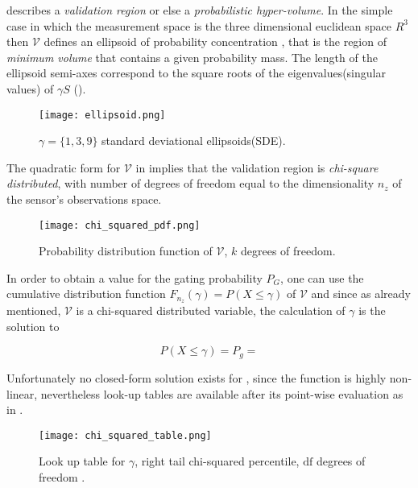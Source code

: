  describes a \emph{validation region} or else a \emph{probabilistic hyper-volume}. In the simple case in which the measurement space is the three dimensional euclidean space $R^3$ then $\mathcal{V}$ defines an ellipsoid of probability concentration , that is the region of \emph{minimum volume }that contains a given probability mass. The length of the ellipsoid semi-axes correspond to the square roots of the eigenvalues(singular values) of $\gamma S$ ().

\begin{figure}[H]
	\centering
	\texttt{[image: ellipsoid.png]}
	\caption{$\gamma = \{1,3,9\}$ standard deviational ellipsoids(SDE)\cite{Wang2015}.}
	\label{fig:ellipsoid}
\end{figure}


The quadratic form for $\mathcal{V}$ in  implies that the validation region is \emph{chi-square distributed}, with number of degrees of freedom equal to the dimensionality $n_z$ of the sensor's observations space.


\begin{figure}[H]
	\centering
	\texttt{[image: chi\_squared\_pdf.png]}
	\caption{Probability distribution function of $\mathcal{V}$, $k$ degrees of freedom.}
	\label{fig:chisquared}
\end{figure}


In order to obtain a value for the gating probability $P_G$, one can use the cumulative distribution function $F_{n_{z}}(\gamma)=P(X \leq \gamma)$ of $\mathcal{V}$ and since as already mentioned, $\mathcal{V}$ is a chi-squared distributed variable, the calculation of $\gamma$ is the solution to 

\begin{equation}\label{eq:gammasol}
P(X \leq \gamma) = P_g = \end{equation}


Unfortunately no closed-form solution exists for  , since the function is highly non-linear, nevertheless look-up tables are available after its point-wise evaluation as in .





\begin{figure}[H]
	\centering
	\texttt{[image: chi\_squared\_table.png]}
	\caption{Look up table for $\gamma$, right tail chi-squared percentile, $\text{df}$ degrees of freedom .}
	\label{fig:chisquaredtable}
\end{figure}



